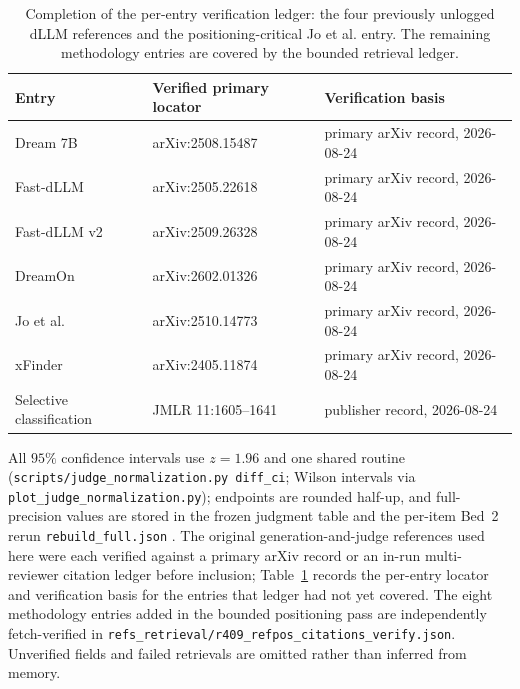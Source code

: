 \documentclass{article}
\begin{document}
\begin{table}[H]
\centering\footnotesize
\setlength{\tabcolsep}{3pt}
\begin{tabularx}{\columnwidth}{@{}>{\raggedright\arraybackslash}p{3.1cm}
                                  >{\raggedright\arraybackslash}p{3.2cm}
                                  >{\raggedright\arraybackslash}X@{}}
\toprule
Entry & Verified primary locator & Verification basis \\
\midrule
Dream 7B \citep{ye2025dream} & arXiv:2508.15487 & primary arXiv record, 2026-08-24 \\
Fast-dLLM \citep{wu2025fastdllm} & arXiv:2505.22618 & primary arXiv record, 2026-08-24 \\
Fast-dLLM v2 \citep{wu2025fastdllmv2} & arXiv:2509.26328 & primary arXiv record, 2026-08-24 \\
DreamOn \citep{wu2026dreamon} & arXiv:2602.01326 & primary arXiv record, 2026-08-24 \\
Jo et al. \citep{jo2025finding} & arXiv:2510.14773 & primary arXiv record, 2026-08-24 \\
xFinder \citep{yu2024xfinder} & arXiv:2405.11874 & primary arXiv record, 2026-08-24 \\
Selective classification \citep{elyaniv2010selective} & JMLR 11:1605--1641 & publisher record, 2026-08-24 \\
\bottomrule
\end{tabularx}
\caption{Completion of the per-entry verification ledger: the four previously
unlogged dLLM references and the positioning-critical Jo et al. entry.  The
remaining methodology entries are covered by the bounded retrieval ledger.}
\label{tab:reference-ledger}
\end{table}

{\raggedright
All $95\%$ confidence intervals use $z{=}1.96$ and one shared routine
(\texttt{scripts/judge\_normalization.py diff\_ci}; Wilson intervals via
\texttt{plot\_judge\_normalization.py}); endpoints are rounded half-up, and
full-precision values are stored in the frozen judgment table and the
per-item Bed~2 rerun \texttt{rebuild\_full.json} .  The
original generation-and-judge references used
here \citep{cobbe2021gsm8k,nie2025llada,li2025daedal,zhou2026dllm,zheng2023judging}
were each verified against a primary arXiv record or an in-run multi-reviewer
citation ledger before inclusion; Table~\ref{tab:reference-ledger} records the
per-entry locator and verification basis for the entries that ledger had not
yet covered.  The eight methodology entries added in the
bounded positioning pass are independently fetch-verified in
\texttt{refs\_retrieval/r409\_refpos\_citations\_verify.json}.  Unverified
fields and failed retrievals are omitted rather than inferred from memory.\par}
\end{document}
